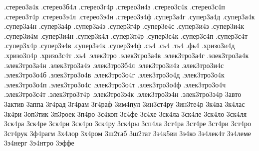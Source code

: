 {.стерео3а4к
.стерео3б4л
.стерео3г4р
.стерео3и4з
.стерео3с4к
.стерео3с4п
.стерео3т4р
.стерео3э4л
.стерео3э4н
.стерео3э4ф
.супер3а4г
.супер3а4д
.супер3а4к
.супер3а4н
.супер3а4р
.супер3а4э
.супер3г4р
.супер3е4с
.супер3и4з
.супер3и4к
.супер3и4м
.супер3и4н
.супер3к4л
.супер3п4р
.супер3с4к
.супер3с4п
.супер3с4т
.супер3х4р
.супер3э4в
.супер3э4к
.супер3э4ф
.съ4
.сь4
.ть4
.фь4
.хризо3и4д
.хризо3п4р
.хризо3с4т
.хь4
.элек3тро
.элек3тро3а4в
.элек3тро3а4г
.элек3тро3а4к
.элек3тро3а4н
.элек3тро3а4э
.элек3тро3б4л
.элек3тро3и4з
.элек3тро3и4с
.элек3тро3о4б
.элек3тро3о4в
.элек3тро3о4г
.элек3тро3о4д
.элек3тро3о4к
.элек3тро3о4п
.элек3тро3о4с
.элек3тро3о4т
.элек3тро3о4ф
.элек3тро3о4ч
.элек3тро3с4т
.элек3тро3т4р
.элек3тро3э4к
.элек3тро3э4н
.элек3тро3э4р
3авто
3актив
3аппа
3г4рад
3г4рам
3г4раф
3им4пул
3ин3ст4ру
3ин3те4р
3к4ва
3к4лас
3к4ри
3оп3тик
3п3роек
3п4ро
3с4коп
3с4фе
3с4хе
3ск4ла
3ск4ле
3ск4ло
3ск4ля
3ск4ра
3ск4ре
3ск4ри
3ск4ро
3ск4ру
3ск4ры
3сп4ла
3ст4ра
3ст4ре
3ст4ри
3ст4ро
3ст4рук
3ф4рагм
3х4лор
3х4ром
3ш2таб
3ш2тат
3э4к5ви
3э4ко
3э4лек4т
3э4леме
3э4нерг
3э4нтро
3эффе
}
